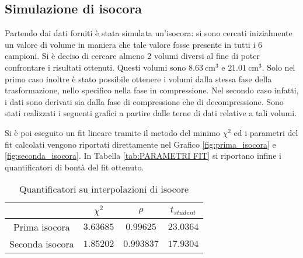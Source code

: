 \documentclass[a4paper,11pt,oneside]{article}
\begin{document}
\subsection{Simulazione di isocora}
Partendo dai dati forniti è stata simulata un'isocora: si sono cercati inizialmente un valore di volume in maniera che tale valore fosse presente in tutti i 6 campioni. Si è deciso di cercare almeno 2 volumi diversi al fine di poter confrontare i risultati ottenuti. Questi volumi sono $\SI{8.63}{\centi\meter\cubed}$ e $\SI{21.01}{\centi\meter\cubed}$. Solo nel primo caso inoltre è stato possibile ottenere i volumi dalla stessa fase della trasformazione, nello specifico nella fase in compressione. Nel secondo caso infatti, i dati sono derivati sia dalla fase di compressione che di decompressione.
Sono stati realizzati i seguenti grafici a partire dalle terne di dati relative a tali volumi.
\begin{figure}[h!]
    \centering
    \label{fig:isocore}
\end{figure}
Si è poi eseguito un fit lineare tramite il metodo del minimo $\chi^2$ ed i parametri del fit calcolati vengono riportati direttamente nel Grafico \ref{fig:prima_isocora} e \ref{fig:seconda_isocora}. In Tabella \ref{tab:PARAMETRI FIT} si riportano infine i quantificatori di bontà del fit ottenuto.

\begin{table}[h!]
    \centering
    \begin{tabular}{|c|c|c|c|}
        \hline
         & $\chi^2$ & $\rho$ & $t_{student}$ \\ \hline
        \rowcolor[rgb]{0.85,0.85,0.85} Prima isocora & $3.63685$ & $0.99625$ & $23.0364$ \\ \hline
        Seconda isocora & $1.85202$ & $0.993837$ & $17.9304$ \\ \hline
    \end{tabular}
    \caption{Quantificatori su interpolazioni di isocore}
    \label{tab:my_label}
\end{table}
\end{document}
